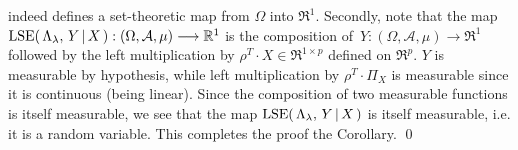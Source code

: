 indeed defines a set-theoretic map from $\Omega$ into $\Re^{1}$.
Secondly, note that the map
$\textnormal{LSE}\!\left(\,\Lambda_{\lambda},\,Y\,\vert\,X\,\right) : (\Omega,\mathcal{A},\mu) \longrightarrow \mathbb{R}^{1}$
is the composition of \,$Y : (\Omega,\mathcal{A},\mu) \rightarrow \Re^{1}$ followed by the
left multiplication by $\rho^{T} \cdot X \in \Re^{1 \times p}$ defined on $\Re^{p}$.
$Y$ is measurable by hypothesis, while left multiplication by $\rho^{T} \cdot \Pi_{X}$ is measurable
since it is continuous (being linear).
Since the composition of two measurable functions is itself measurable,
we see that the map $\textnormal{LSE}\!\left(\,\Lambda_{\lambda},\,Y\,\vert\,X\,\right)$ is itself measurable,
i.e. it is a random variable.
This completes the proof the Corollary.
\qed

